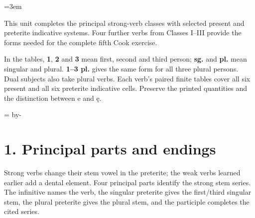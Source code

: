 \newcommand{\runningtitle}{Unit 5. Strong verbs IV–VII}

\emergencystretch=3em
\newcommand{\itempara}[2]{\par\addvspace{3pt}\noindent\hangindent=1.8em\hangafter=1\makebox[1.8em][l]{#1.}#2\par}
\newcommand{\reserve}[1]{\par\penalty-100\begingroup\dimen0=\pagegoal\advance\dimen0 by-\pagetotal\ifdim\dimen0<#1\newpage\fi\endgroup}

\raggedright
{}

This unit completes the principal strong-verb classes with selected present and preterite indicative systems. Four further verbs from Classes I–III provide the forms needed for the complete fifth Cook exercise.

In the tables, \textbf{1}, \textbf{2} and \textbf{3} mean first, second and third person; \textbf{sg.} and \textbf{pl.} mean singular and plural. \textbf{1–3 pl.} gives the same form for all three plural persons. Dual subjects also take plural verbs. Each verb’s paired finite tables cover all six present and all six preterite indicative cells. Preserve the printed quantities and the distinction between e and ę.

\reserve{7\baselineskip}
\section*{1. Principal parts and endings}

Strong verbs change their stem vowel in the preterite; the weak verbs learned earlier add a dental element. Four principal parts identify the strong stem series. The infinitive names the verb, the singular preterite gives the first/\allowbreak{}third singular stem, the plural preterite gives the plural stem, and the participle completes the cited series.

